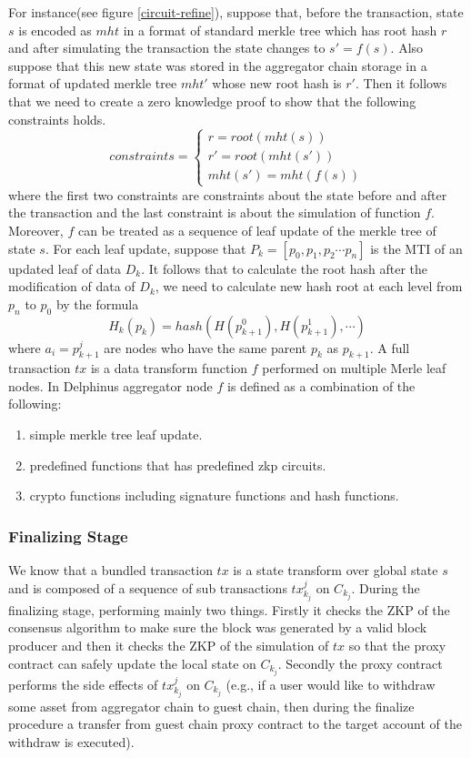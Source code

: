 \documentclass[pageno]{jpaper}
\begin{document}
For instance(see figure \ref{circuit-refine}), suppose that, before the transaction, state $s$ is encoded as $mht$ in a format of standard merkle tree which has root hash $r$ and after simulating the transaction the state changes to $s' = f(s)$. Also suppose that this new state was stored in the aggregator chain storage in a format of updated merkle tree $mht'$ whose new root hash is $r'$.
Then it follows that we need to create a zero knowledge proof to show that the following constraints holds.
\[ constraints = \begin{cases}
    r = root(mht(s)) \\
    r' = root(mht(s'))\\
    mht(s') = mht(f(s))
\end{cases} \]
where the first two constraints are constraints about the state before and after the transaction and the last constraint is about the simulation of function $f$.\\
\newline
Moreover, $f$ can be treated as a sequence of leaf update of the merkle tree of state $s$. For each leaf update, suppose that $P_k = [p_0, p_1, p_2 \cdots p_n]$ is the MTI of an updated leaf of data $D_k$. It follows that to calculate the root hash after the modification of data of $D_k$, we need to calculate new hash root at each level from $p_n$ to $p_0$ by the formula
$$
    H_k(p_k) = hash(H(p_{k+1}^0), H(p_{k+1}^1),\cdots) 
$$
where $a_i = p_{k+1}^{j}$ are nodes who have the same parent $p_k$ as $p_{k+1}$\cite{liskov2005updatable}. A full transaction $tx$ is a data transform function $f$ performed on multiple Merle leaf nodes. In Delphinus aggregator node $f$ is defined as a combination of the following:

\begin{enumerate}[leftmargin=*]
\item simple merkle tree leaf update.
\item predefined functions that has predefined zkp circuits.
\item crypto functions including signature functions and hash functions.
\end{enumerate}

\subsubsection{Finalizing Stage}
We know that a bundled transaction $tx$ is a state transform over global state $s$ and is composed of a sequence of sub transactions $tx^j_{k_j}$ on $C_{k_j}$. During the finalizing stage, \dprotocol performing mainly two things. Firstly it checks the ZKP of the consensus algorithm to make sure the block was generated by a valid block producer and then it checks the ZKP of the simulation of $tx$ so that the proxy contract can safely update the local state on $C_{k_j}$. Secondly the proxy contract performs the side effects of $tx^j_{k_j}$ on $C_{k_j}$ (e.g., if a user would like to withdraw some asset from aggregator chain to guest chain, then during the finalize procedure a transfer from guest chain proxy contract to the target account of the withdraw is executed).
\end{document}
